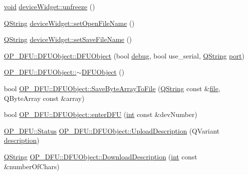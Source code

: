 \begin{DoxyCompactItemize}
\item 
\hyperlink{group___u_a_v_objects_plugin_ga444cf2ff3f0ecbe028adce838d373f5c}{void} \hyperlink{group___uploader_ga6273e94cd08759c019fbb9a1063cbd26}{device\-Widget\-::unfreeze} ()
\item 
\hyperlink{group___u_a_v_objects_plugin_gab9d252f49c333c94a72f97ce3105a32d}{Q\-String} \hyperlink{group___uploader_ga6ad26364234edf8c743b0b08885050b1}{device\-Widget\-::set\-Open\-File\-Name} ()
\item 
\hyperlink{group___u_a_v_objects_plugin_gab9d252f49c333c94a72f97ce3105a32d}{Q\-String} \hyperlink{group___uploader_ga1c33b640cfaca086fcfd5574eecec8ef}{device\-Widget\-::set\-Save\-File\-Name} ()
\item 
\hyperlink{group___uploader_gacb8ee3e1b1358ae25813e37f08b6d510}{O\-P\-\_\-\-D\-F\-U\-::\-D\-F\-U\-Object\-::\-D\-F\-U\-Object} (bool \hyperlink{synchronousprocess_8cpp_a3e279efabf854742684341c3e4f50d31a5be0fd270d9cbf6a0b7445db855089da}{debug}, bool use\-\_\-serial, \hyperlink{group___u_a_v_objects_plugin_gab9d252f49c333c94a72f97ce3105a32d}{Q\-String} \hyperlink{classport}{port})
\item 
\hyperlink{group___uploader_gad3eb7cce298c72c456a84eb04cc9c0fe}{O\-P\-\_\-\-D\-F\-U\-::\-D\-F\-U\-Object\-::$\sim$\-D\-F\-U\-Object} ()
\item 
bool \hyperlink{group___uploader_ga1422e01836cfff2d47cd09bfbbdde774}{O\-P\-\_\-\-D\-F\-U\-::\-D\-F\-U\-Object\-::\-Save\-Byte\-Array\-To\-File} (\hyperlink{group___u_a_v_objects_plugin_gab9d252f49c333c94a72f97ce3105a32d}{Q\-String} const \&\hyperlink{uavobjecttemplate_8m_a97c04efa65bcf0928abf9260bc5cbf46}{file}, Q\-Byte\-Array const \&array)
\item 
bool \hyperlink{group___uploader_ga64ed24565b35c4530dd2614cc98f38cd}{O\-P\-\_\-\-D\-F\-U\-::\-D\-F\-U\-Object\-::enter\-D\-F\-U} (\hyperlink{ioapi_8h_a787fa3cf048117ba7123753c1e74fcd6}{int} const \&dev\-Number)
\item 
\hyperlink{class_o_p___d_f_u_a83b075feaf572fe76e597acea58c8eda}{O\-P\-\_\-\-D\-F\-U\-::\-Status} \hyperlink{group___uploader_ga6513c6ff0fee1f11aebd6312296e6ed6}{O\-P\-\_\-\-D\-F\-U\-::\-D\-F\-U\-Object\-::\-Upload\-Description} (Q\-Variant \hyperlink{sdlgamepad_8dox_ae82208d022e4246ddf1e4f481a3f81b0}{description})
\item 
\hyperlink{group___u_a_v_objects_plugin_gab9d252f49c333c94a72f97ce3105a32d}{Q\-String} \hyperlink{group___uploader_ga5c3ae32c69bac4c663f6be430da1db3d}{O\-P\-\_\-\-D\-F\-U\-::\-D\-F\-U\-Object\-::\-Download\-Description} (\hyperlink{ioapi_8h_a787fa3cf048117ba7123753c1e74fcd6}{int} const \&number\-Of\-Chars)

\end{DoxyCompactItemize}
